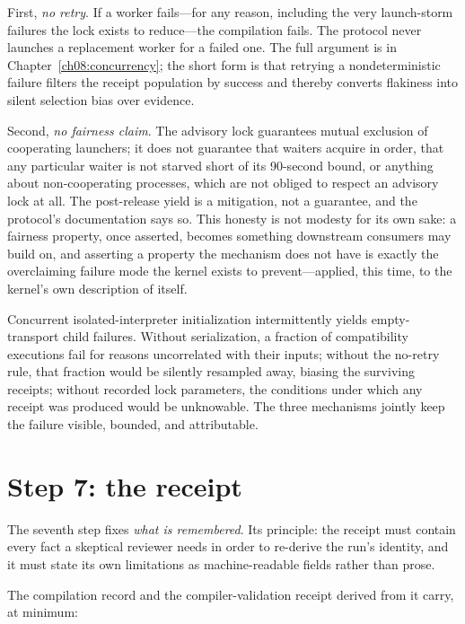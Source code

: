 First, \emph{no retry}. If a worker fails---for any reason, including the very launch-storm failures the lock exists to reduce---the compilation fails. The protocol never launches a replacement worker for a failed one. The full argument is in Chapter~\ref{ch08:concurrency}; the short form is that retrying a nondeterministic failure filters the receipt population by success and thereby converts flakiness into silent selection bias over evidence.

Second, \emph{no fairness claim}. The advisory lock guarantees mutual exclusion of cooperating launchers; it does not guarantee that waiters acquire in order, that any particular waiter is not starved short of its 90-second bound, or anything about non-cooperating processes, which are not obliged to respect an advisory lock at all. The post-release yield is a mitigation, not a guarantee, and the protocol's documentation says so. This honesty is not modesty for its own sake: a fairness property, once asserted, becomes something downstream consumers may build on, and asserting a property the mechanism does not have is exactly the overclaiming failure mode the kernel exists to prevent---applied, this time, to the kernel's own description of itself.

\begin{threat}\label{ch07:threat:storm}
Concurrent isolated-interpreter initialization intermittently yields empty-transport child failures. Without serialization, a fraction of compatibility executions fail for reasons uncorrelated with their inputs; without the no-retry rule, that fraction would be silently resampled away, biasing the surviving receipts; without recorded lock parameters, the conditions under which any receipt was produced would be unknowable. The three mechanisms jointly keep the failure visible, bounded, and attributable.
\end{threat}

\section{Step 7: the receipt}\label{ch07:step7}

The seventh step fixes \emph{what is remembered}. Its principle: the receipt must contain every fact a skeptical reviewer needs in order to re-derive the run's identity, and it must state its own limitations as machine-readable fields rather than prose.

The compilation record and the compiler-validation receipt derived from it carry, at minimum:

